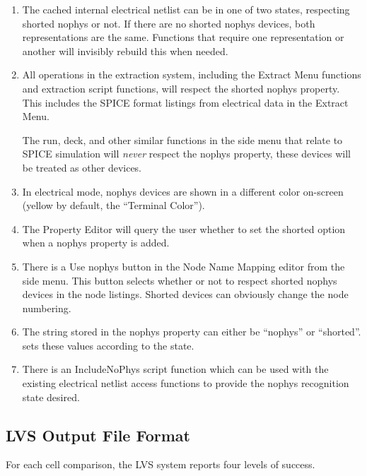 \begin{enumerate}
\item{The cached internal electrical netlist can be in one of two
states, respecting shorted {\et nophys} or not.  If there are no
shorted {\et nophys} devices, both representations are the same. 
Functions that require one representation or another will invisibly
rebuild this when needed.}

\item{All operations in the extraction system, including the {\cb
Extract Menu} functions and extraction script functions, will respect
the shorted {\et nophys} property.  This includes the SPICE format
listings from electrical data in the {\cb Extract Menu}.

The {\cb run}, {\cb deck}, and other similar functions in the side
menu that relate to SPICE simulation will {\it never} respect the {\et
nophys} property, these devices will be treated as other devices.}

\item{In electrical mode, {\et nophys} devices are shown in a different
color on-screen (yellow by default, the ``Terminal Color'').}

\item{The {\cb Property Editor} will query the user whether to set
the shorted option when a {\et nophys} property is added.}

\item{There is a {\cb Use nophys} button in the {\cb Node Name
Mapping} editor from the side menu.  This button selects whether or
not to respect shorted {\et nophys} devices in the node listings. 
Shorted devices can obviously change the node numbering.}

\item{The string stored in the {\et nophys} property can either be
``{\vt nophys}'' or ``{\vt shorted}''.  {\Xic} sets these values
according to the state.}

\item{There is an {\vt IncludeNoPhys}
script function which can be used with the existing electrical
netlist access functions to provide the {\et nophys} recognition
state desired.}
\end{enumerate}

\subsection{LVS Output File Format}

For each cell comparison, the LVS system reports four levels of
success.

